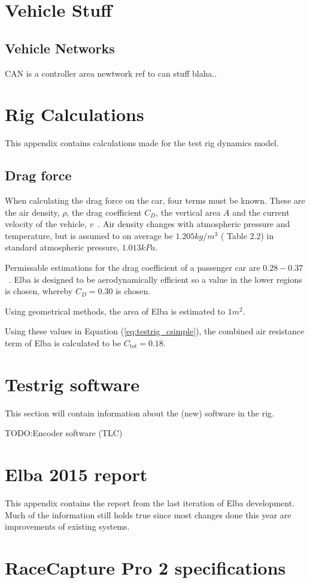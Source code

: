 \chapter{Vehicle Stuff}\label{appA}

\section{Vehicle Networks}
CAN is a controller area newtwork ref to can stuff blaha..

\chapter{Rig Calculations}\label{app:rigdata}
This appendix contains calculations made for the test rig dynamics model. 

\section*{Drag force}
When calculating the drag force on the car, four terms must be known.
These are the air density, $\rho$, the drag coefficient $C_D$, the vertical area
$A$ and the current velocity of the vehicle, $v$~\cite{nakayama2002}. Air
density changes with atmospheric pressure and temperature, but is assumed to on
average be $1.205\si{kg/m^3}$ (\cite{nakayama2002} Table 2.2) in standard
atmospheric pressure, $1.013\si{kPa}$. 

Permissable estimations for the drag coefficient of a passenger car are
$0.28-0.37$~\cite{nakayama2002}. Elba is designed to be aerodynamically
efficient so a value in the lower regions is chosen, whereby $C_D = 0.30$ is
chosen.

Using geometrical methods, the area of Elba is estimated to $1\si{m^2}$.

Using these values in Equation (\ref{eq:testrig_csimple}), the combined air
resistance term of Elba is calculated to be $C_{tot} = 0.18$.

\chapter{Testrig software}
This section will contain information about the (new) software in the rig.

TODO\@:Encoder software (TLC)


\chapter{Elba 2015 report}\label{app:elba2015}
This appendix contains the report from the last iteration of Elba development.
Much of the information still holds true since most changes done this year are
improvements of existing systems.
%

\chapter{RaceCapture Pro 2 specifications}\label{app:RCP}

